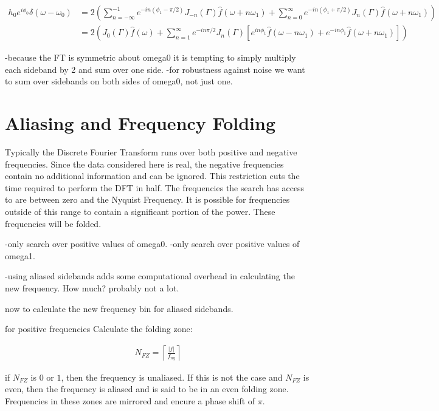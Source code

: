 \documentclass[onecolumn, groupedaddress, 10pt]{revtex4-1}
\begin{document}
\begin{align}
h_0 e^{i\phi_0} \delta (\omega - \omega_0) 
&= 2 
	\left( 
  		  \sum_{n=-\infty}^{-1} e^{-in(\phi_1-\pi/2)} J_{-n}(\Gamma) \hat{f} (\omega + n\omega_1)
		+ \sum_{n=0}^{\infty} e^{-in(\phi_1+\pi/2)} J_n(\Gamma) \hat{f} (\omega + n\omega_1)
	\right)																							\\
&= 2 
	\left( 
		J_0(\Gamma) \hat{f} (\omega) + \sum_{n=1}^{\infty} e^{-in\pi/2} J_n(\Gamma) 
		\left[ 
			e^{in\phi_1} \hat{f} (\omega - n\omega_1) + e^{-in\phi_1} \hat{f} (\omega + n\omega_1) 
		\right]
	\right)
\end{align}

-because the FT is symmetric about omega0 it is tempting to simply multiply each sideband by 2 and sum over one side.
-for robustness against noise we want to sum over sidebands on both sides of omega0, not just one.




\section{Aliasing and Frequency Folding}
Typically the Discrete Fourier Transform runs over both positive and negative frequencies.  Since the data considered here is real, the negative frequencies contain no additional information and can be ignored.  This restriction cuts the time required to perform the DFT in half.  The frequencies the search has access to are between zero and the Nyquist Frequency.  It is possible for frequencies outside of this range to contain a significant portion of the power.  These frequencies will be folded.  



-only search over positive values of omega0.
-only search over positive values of omega1.


-using aliased sidebands adds some computational overhead in calculating the new frequency.  How much? probably not a lot.




now to calculate the new frequency bin for aliased sidebands. 

for positive frequencies
Calculate the folding zone:

\begin{align}
N_{FZ} = \left\lceil \frac{|f|}{f_{nq}} \right\rceil
\end{align} 

if $N_{FZ}$ is $0$ or $1$, then the frequency is unaliased.  If this is not the case and $N_{FZ}$ is even, then the frequency is aliased and is said to be in an even folding zone.  Frequencies in these zones are mirrored and encure a phase shift of $\pi$.  
\end{document}
